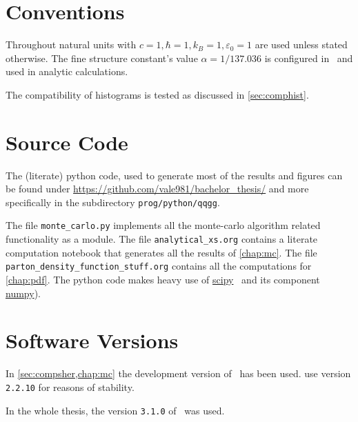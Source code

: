 \section{Conventions}%
\label{sec:convent}

Throughout natural units with
\(c=1, \hbar = 1, k_B=1, \varepsilon_0 = 1\) are used unless stated
otherwise. The fine structure constant's value \(\alpha = 1/137.036\)
is configured in \sherpa\ and used in analytic calculations.

The compatibility of histograms is tested as discussed in
\cref{sec:comphist}.

\section{Source Code}%
\label{sec:source}

The (literate) python code, used to generate most of the results and
figures can be found under
\url{https://github.com/vale981/bachelor_thesis/} and more
specifically in the subdirectory \texttt{prog/python/qqgg}.

The file \texttt{monte\_carlo.py} implements all the monte-carlo
algorithm related functionality as a module. The file
\texttt{analytical\_xs.org} contains a literate computation notebook
that generates all the results of \cref{chap:mc}. The file
\texttt{parton\_density\_function\_stuff.org} contains all the
computations for \cref{chap:pdf}. The python code makes heavy use of
\href{https://www.scipy.org/}{scipy}~\cite{2020Virtanen:Sc} and
its component \href{https://numpy.org/}{numpy}).

\section{Software Versions}%
\label{sec:versions}

In \cref{sec:compsher,chap:mc} the development version of \sherpa\ has
been used.  use version \texttt{2.2.10} for
reasons of stability.

In the whole thesis, the version \texttt{3.1.0} of \rivet\ was used.

